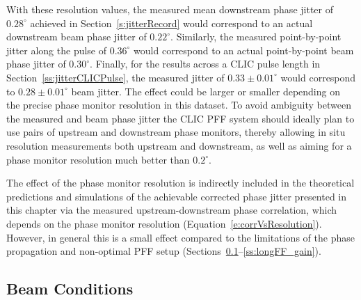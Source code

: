 With these resolution values, the measured mean downstream phase jitter of \(0.28^\circ\) achieved in Section~\ref{s:jitterRecord} would correspond to an actual downstream beam phase jitter of \(0.22^\circ\). Similarly, the measured point-by-point jitter along the pulse of \(0.36^\circ\) would correspond to an actual point-by-point beam phase jitter of \(0.30^\circ\). Finally, for the results across a CLIC pulse length in Section~\ref{ss:jitterCLICPulse}, the measured jitter of \(0.33\pm0.01^\circ\) would correspond to \(0.28\pm0.01^\circ\) beam jitter. The effect could be larger or smaller depending on the precise phase monitor resolution in this dataset. To avoid ambiguity between the measured and beam phase jitter the CLIC PFF system should ideally plan to use pairs of upstream and downstream phase monitors, thereby allowing in situ resolution measurements both upstream and downstream, as well as aiming for a phase monitor resolution much better than \(0.2^\circ\).

The effect of the phase monitor resolution is indirectly included in the theoretical predictions and simulations of the achievable corrected phase jitter presented in this chapter via the measured upstream-downstream phase correlation, which depends on the phase monitor resolution (Equation~\ref{e:corrVsResolution}). However, in general this is a small effect compared to the limitations of the phase propagation and non-optimal PFF setup (Sections~\ref{ss:longFF_beamConds}--\ref{ss:longFF_gain}).


\subsection{Beam Conditions}
\label{ss:longFF_beamConds}


